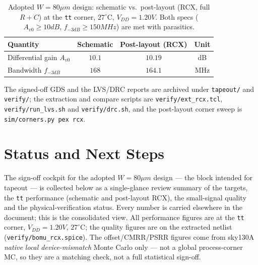 \documentclass{article}
\begin{document}
\begin{table}[H]
    \centering
    \caption{Adopted $W=80\mu m$ design: schematic vs.\ post-layout (RCX, full
    $R+C$) at the \texttt{tt} corner, $27^{\circ}$C, $V_{DD}=1.20V$. Both specs
    ($A_{v0}\ge10dB$, $f_{-3dB}\ge150MHz$) are met with parasitics.}
    \label{tab:postlayout}
    \begin{tabular}{|l|c|c|c|}
        \hline
        \textbf{Quantity} & \textbf{Schematic} & \textbf{Post-layout (RCX)} & \textbf{Unit} \\ \hline
        Differential gain $A_{v0}$ & $10.1$ & $10.19$ & dB \\ \hline
        Bandwidth $f_{-3dB}$       & $168$  & $164.1$ & MHz \\ \hline
    \end{tabular}
\end{table}

The signed-off GDS and the LVS/DRC reports are archived under \texttt{tapeout/} and
\texttt{verify/}; the extraction and compare scripts are \texttt{verify/ext\_rcx.tcl},
\texttt{verify/run\_lvs.sh} and \texttt{verify/drc.sh}, and the post-layout corner
sweep is \texttt{sim/corners.py pex rcx}.

\section{Status and Next Steps}
\label{sec:status}
The sign-off cockpit for the adopted $W=80\mu m$ design --- the block intended for
tapeout --- is collected below as a single-glance review summary of the targets, the
\texttt{tt} performance (schematic and post-layout RCX), the small-signal quality and the
physical-verification status. Every number is carried elsewhere in the document; this is
the consolidated view. All performance figures are at the \texttt{tt} corner,
$V_{DD}=1.20V$, $27^\circ$C; the quality figures are on the extracted netlist
(\texttt{verify/bomu\_rcx.spice}). The offset/CMRR/PSRR figures come from sky130A
\emph{native local device-mismatch} Monte Carlo only --- not a global process-corner MC,
so they are a matching check, not a full statistical sign-off.
\end{document}
